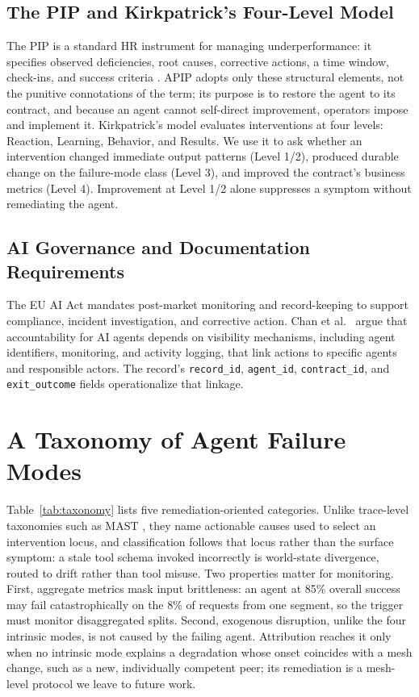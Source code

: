 \documentclass[conference]{IEEEtran}
\begin{document}
\subsection{The PIP and Kirkpatrick's Four-Level Model}

The PIP is a standard HR instrument for managing underperformance: it specifies observed deficiencies, root causes, corrective actions, a time window, check-ins, and success criteria \cite{ref21}. APIP adopts only these structural elements, not the punitive connotations of the term; its purpose is to restore the agent to its contract, and because an agent cannot self-direct improvement, operators impose and implement it. Kirkpatrick's model \cite{ref7,ref13} evaluates interventions at four levels: Reaction, Learning, Behavior, and Results. We use it to ask whether an intervention changed immediate output patterns (Level 1/2), produced durable change on the failure-mode class (Level 3), and improved the contract's business metrics (Level 4). Improvement at Level 1/2 alone suppresses a symptom without remediating the agent.

\subsection{AI Governance and Documentation Requirements}

The EU AI Act \cite{ref6} mandates post-market monitoring and record-keeping to support compliance, incident investigation, and corrective action. Chan et al.~\cite{ref14} argue that accountability for AI agents depends on visibility mechanisms, including agent identifiers, monitoring, and activity logging, that link actions to specific agents and responsible actors. The record's \texttt{record\_id}, \texttt{agent\_id}, \texttt{contract\_id}, and \texttt{exit\_outcome} fields operationalize that linkage.

\section{A Taxonomy of Agent Failure Modes}

Table~\ref{tab:taxonomy} lists five remediation-oriented categories. Unlike trace-level taxonomies such as MAST \cite{ref8}, they name actionable causes used to select an intervention locus, and classification follows that locus rather than the surface symptom: a stale tool schema invoked incorrectly is world-state divergence, routed to drift rather than tool misuse. Two properties matter for monitoring. First, aggregate metrics mask input brittleness: an agent at 85\% overall success may fail catastrophically on the 8\% of requests from one segment, so the trigger must monitor disaggregated splits. Second, exogenous disruption, unlike the four intrinsic modes, is not caused by the failing agent. Attribution reaches it only when no intrinsic mode explains a degradation whose onset coincides with a mesh change, such as a new, individually competent peer; its remediation is a mesh-level protocol we leave to future work.
\end{document}
